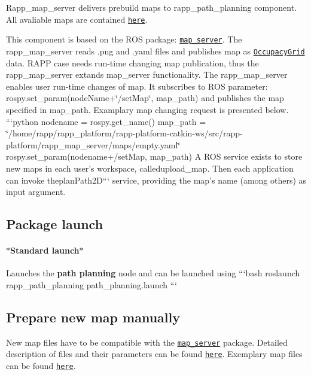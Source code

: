 Rapp\-\_\-map\-\_\-server delivers prebuild maps to rapp\-\_\-path\-\_\-planning component. All avaliable maps are contained \href{https://github.com/rapp-project/rapp-platform/tree/master/rapp_map_server/maps}{\tt here}.

This component is based on the R\-O\-S package\-: \href{http://wiki.ros.org/map_server}{\tt map\-\_\-server}. The rapp\-\_\-map\-\_\-server reads .png and .yaml files and publishes map as \href{http://docs.ros.org/jade/api/nav_msgs/html/msg/OccupancyGrid.html}{\tt Occupacy\-Grid} data. R\-A\-P\-P case needs run-\/time changing map publication, thus the rapp\-\_\-map\-\_\-server extands map\-\_\-server functionality. The rapp\-\_\-map\-\_\-server enables user run-\/time changes of map. It subscribes to R\-O\-S parameter\-: {\ttfamily rospy.\-set\-\_\-param(node\-Name+\char`\"{}/set\-Map\char`\"{}, map\-\_\-path)} and publishes the map specified in map\-\_\-path. Examplary map changing request is presented below. ```python nodename = rospy.\-get\-\_\-name() map\-\_\-path = \char`\"{}/home/rapp/rapp\-\_\-platform/rapp-\/platform-\/catkin-\/ws/src/rapp-\/platform/rapp\-\_\-map\-\_\-server/maps/empty.\-yaml\char`\"{} rospy.\-set\-\_\-param(nodename+/set\-Map, map\-\_\-path) {\ttfamily  A R\-O\-S service exists to store new maps in each user's workspace, called}upload\-\_\-map{\ttfamily . Then each application can invoke the}plan\-Path2\-D``` service, providing the map's name (among others) as input argument.

\subsection*{Package launch}

\paragraph*{$\ast$\-Standard launch$\ast$}

Launches the {\bfseries path planning} node and can be launched using ```bash roslaunch rapp\-\_\-path\-\_\-planning path\-\_\-planning.\-launch ```

\subsection*{Prepare new map manually}

New map files have to be compatible with the \href{http://wiki.ros.org/map_server}{\tt map\-\_\-server} package. Detailed description of files and their parameters can be found \href{http://wiki.ros.org/map_server/#Map_format}{\tt here}. Exemplary map files can be found \href{https://github.com/rapp-project/rapp-platform/tree/devel/rapp_path_planning/rapp_map_server/maps}{\tt here}.


